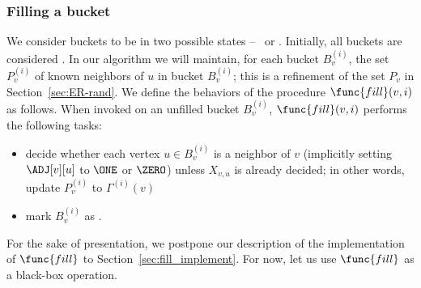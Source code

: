 \subsubsection{Filling a bucket}
\label{sec:bucket_filling}

We consider buckets to be in two possible states -- \filled~or \unfilled.
Initially, all buckets are considered \unfilled.
In our algorithm we will maintain, for each bucket $B^{(i)}_v$, the set $P^{(i)}_v$ of known neighbors of $u$ in bucket $B^{(i)}_v$; this is a refinement of the set $P_v$ in Section~\ref{sec:ER-rand}. 
We define the behaviors of the procedure $\func{fill}(v,i)$ as follows. When invoked on an unfilled bucket $B_v^{(i)}$, $\func{fill}(v,i)$ performs the following tasks:
\begin{itemize}
\item decide whether each vertex $u \in B_v^{(i)}$ is a neighbor of $v$ (implicitly setting $\ADJ[v][u]$ to $\ONE$ or $\ZERO$) unless $X_{v,u}$ is already decided; in other words, update $P_v^{(i)}$ to $\Gamma^{(i)}(v)$
\item mark $B_v^{(i)}$ as \filled.
\end{itemize}
For the sake of presentation, we postpone our description of the implementation of $\func{fill}$ to Section~\ref{sec:fill_implement}. For now, let us use $\func{fill}$ as a black-box operation.
